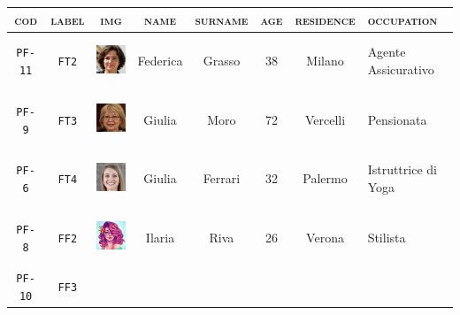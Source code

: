 \begin{tabular}[c]{ |c|c|m{1.5cm}|c|c|c|c|m{1.85cm}| } 
	\hline
	\cellcolor[HTML]{b0d7ff}\textsc{cod} & 
	\cellcolor[HTML]{b0d7ff}\textsc{label} & 
	\multicolumn{1}{|c|}{\cellcolor[HTML]{b0d7ff}\textsc{img}}&
	\cellcolor[HTML]{b0d7ff}\textsc{name} & 
	\cellcolor[HTML]{b0d7ff}\textsc{surname} &
	\cellcolor[HTML]{b0d7ff}\textsc{age} &
	\cellcolor[HTML]{b0d7ff}\textsc{residence}	&
	\cellcolor[HTML]{b0d7ff}\textsc{occupation}	\\
	\hline 
	\cellcolor[HTML]{b0d7ff}\texttt{PF-11}&\cellcolor[HTML]{e6f2ff}\texttt{FT2}&	
	\vspace{.15cm}
	\includegraphics[height=1.5cm]{immagini/FT2.jpg}			
	&Federica&Grasso&38&Milano&Agente \newline Assicurativo\\	
	\hline
	\cellcolor[HTML]{b0d7ff}\texttt{PF-9}&\cellcolor[HTML]{e6f2ff}\texttt{FT3}&	
	\vspace{.15cm}		
	\includegraphics[height=1.5cm]{immagini/FT3.jpg}
	&Giulia&Moro&72&Vercelli&Pensionata\\	 
	\hline
	\cellcolor[HTML]{b0d7ff}\texttt{PF-6}&\cellcolor[HTML]{e6f2ff}\texttt{FT4}&	
	\vspace{.15cm}
	\includegraphics[height=1.5cm]{immagini/FT4.jpg}
	&Giulia&Ferrari&32&Palermo&Istruttrice di Yoga\\ 
	\hline
	\cellcolor[HTML]{b0d7ff}\texttt{PF-8}&\cellcolor[HTML]{e6f2ff}\texttt{FF2}&	
	\vspace{.15cm}
	\includegraphics[height=1.5cm]{immagini/FF2.png}
	&Ilaria&Riva&26&Verona&Stilista\\	 
	\hline
	\cellcolor[HTML]{b0d7ff}\texttt{PF-10}&\cellcolor[HTML]{e6f2ff}\texttt{FF3}&	

\end{tabular}
